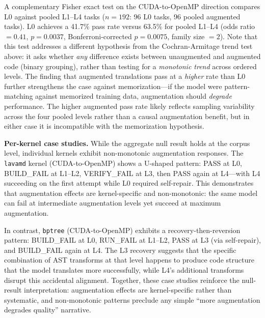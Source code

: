 \documentclass[conference]{IEEEtran}
\begin{document}
A complementary Fisher exact test on the CUDA-to-OpenMP direction compares L0 against pooled L1--L4 tasks ($n = 192$: 96 L0 tasks, 96 pooled augmented tasks). L0 achieves a 41.7\% pass rate versus 63.5\% for pooled L1--L4 (odds ratio $= 0.41$, $p = 0.0037$, Bonferroni-corrected $p = 0.0075$, family size $= 2$). Note that this test addresses a different hypothesis from the Cochran-Armitage trend test above: it asks whether \emph{any} difference exists between unaugmented and augmented code (binary grouping), rather than testing for a \emph{monotonic trend} across ordered levels. The finding that augmented translations pass at a \emph{higher} rate than L0 further strengthens the case against memorization---if the model were pattern-matching against memorized training data, augmentation should \emph{degrade} performance. The higher augmented pass rate likely reflects sampling variability across the four pooled levels rather than a causal augmentation benefit, but in either case it is incompatible with the memorization hypothesis.

\textbf{Per-kernel case studies.} While the aggregate null result holds at the corpus level, individual kernels exhibit non-monotonic augmentation responses. The \texttt{lavamd} kernel (CUDA-to-OpenMP) shows a U-shaped pattern: PASS at L0, BUILD\_FAIL at L1--L2, VERIFY\_FAIL at L3, then PASS again at L4---with L4 succeeding on the first attempt while L0 required self-repair. This demonstrates that augmentation effects are kernel-specific and non-monotonic: the same model can fail at intermediate augmentation levels yet succeed at maximum augmentation.

In contrast, \texttt{bptree} (CUDA-to-OpenMP) exhibits a recovery-then-reversion pattern: BUILD\_FAIL at L0, RUN\_FAIL at L1--L2, PASS at L3 (via self-repair), and BUILD\_FAIL again at L4. The L3 recovery suggests that the specific combination of AST transforms at that level happens to produce code structure that the model translates more successfully, while L4's additional transforms disrupt this accidental alignment. Together, these case studies reinforce the null-result interpretation: augmentation effects are kernel-specific rather than systematic, and non-monotonic patterns preclude any simple ``more augmentation degrades quality'' narrative.
\end{document}
